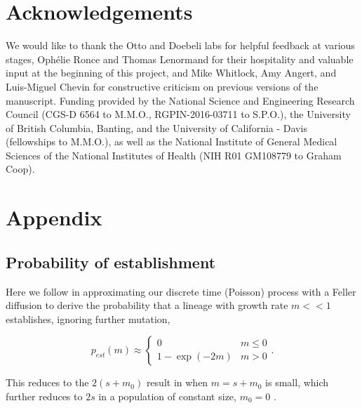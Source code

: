 \documentclass[9pt,twocolumn,twoside,lineno]{gsajnl}
\begin{document}
\section{Acknowledgements}

We would like to thank the Otto and Doebeli labs for helpful feedback at various stages, Oph\'{e}lie Ronce and Thomas Lenormand for their hospitality and valuable input at the beginning of this project, and Mike Whitlock, Amy Angert, and Luis-Miguel Chevin for constructive criticism on previous versions of the manuscript.
Funding provided by the National Science and Engineering Research Council (CGS-D 6564 to M.M.O., RGPIN-2016-03711 to S.P.O.), the University of British Columbia, Banting, and the University of California - Davis (fellowships to M.M.O.), as well as the National Institute of General Medical Sciences of the National Institutes of Health (NIH R01 GM108779 to Graham Coop).



\section{Appendix}
\label{sec:appendix}

\subsection{Probability of establishment}

Here we follow \cite{Martin2013} in approximating our discrete time (Poisson) process with a Feller diffusion to derive the probability that a lineage with growth rate $m<<1$ establishes, ignoring further mutation,

\begin{equation}\label{eq:pestm}
p_{est}(m) \approx
\begin{cases}
	0 & m \leq 0 \\
	1-\exp(-2 m) & m > 0
\end{cases}.
\end{equation}

\noindent This reduces to the $2(s+m_{0})$ result in \cite{Otto1997} when $m = s + m_{0}$ is small, which further reduces to $2s$ in a population of constant size, $m_{0}=0$ \citep{Haldane1927}.
\end{document}
